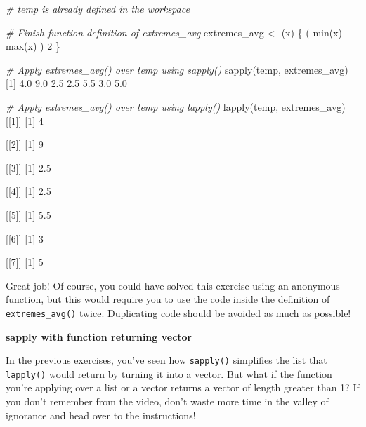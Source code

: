 \documentclass[]{article}
\newcommand{\hlnum}[1]{\textcolor[rgb]{0.816,0.125,0.439}{#1}}%
\newcommand{\hlstr}[1]{\textcolor[rgb]{0.251,0.627,0.251}{#1}}%
\newcommand{\hlcom}[1]{\textcolor[rgb]{0.502,0.502,0.502}{\textit{#1}}}%
\newcommand{\hlstd}[1]{\textcolor[rgb]{0.251,0.251,0.251}{#1}}%
\newcommand{\hlkwd}[1]{\textcolor[rgb]{0.878,0.439,0.125}{#1}}%
\newenvironment{Shaded}{\begin{myshaded}}{\end{myshaded}}
\newcommand{\KeywordTok}[1]{\hlkwd{#1}}
\newcommand{\DecValTok}[1]{\hlnum{#1}}
\newcommand{\FloatTok}[1]{\hlnum{#1}}
\newcommand{\StringTok}[1]{\hlstr{#1}}
\newcommand{\CommentTok}[1]{\hlcom{#1}}
\newcommand{\NormalTok}[1]{\hlstd{#1}}
\begin{document}
\begin{Shaded}
\begin{Highlighting}[]
\CommentTok{# temp is already defined in the workspace}

\CommentTok{# Finish function definition of extremes_avg}
\NormalTok{extremes_avg <-}\StringTok{ }\NormalTok{(x) \{}
\NormalTok{  ( }\KeywordTok{min}\NormalTok{(x) }\OperatorTok{+}\StringTok{ }\KeywordTok{max}\NormalTok{(x) ) }\OperatorTok{/}\StringTok{ }\DecValTok{2}
\NormalTok{\}}

\CommentTok{# Apply extremes_avg() over temp using sapply()}
\KeywordTok{sapply}\NormalTok{(temp, extremes_avg)}
\NormalTok{   [}\DecValTok{1}\NormalTok{] }\FloatTok{4.0} \FloatTok{9.0} \FloatTok{2.5} \FloatTok{2.5} \FloatTok{5.5} \FloatTok{3.0} \FloatTok{5.0}

\CommentTok{# Apply extremes_avg() over temp using lapply()}
\KeywordTok{lapply}\NormalTok{(temp, extremes_avg)}
\NormalTok{   [[}\DecValTok{1}\NormalTok{]]}
\NormalTok{   [}\DecValTok{1}\NormalTok{] }\DecValTok{4}
   
\NormalTok{   [[}\DecValTok{2}\NormalTok{]]}
\NormalTok{   [}\DecValTok{1}\NormalTok{] }\DecValTok{9}
   
\NormalTok{   [[}\DecValTok{3}\NormalTok{]]}
\NormalTok{   [}\DecValTok{1}\NormalTok{] }\FloatTok{2.5}
   
\NormalTok{   [[}\DecValTok{4}\NormalTok{]]}
\NormalTok{   [}\DecValTok{1}\NormalTok{] }\FloatTok{2.5}
   
\NormalTok{   [[}\DecValTok{5}\NormalTok{]]}
\NormalTok{   [}\DecValTok{1}\NormalTok{] }\FloatTok{5.5}
   
\NormalTok{   [[}\DecValTok{6}\NormalTok{]]}
\NormalTok{   [}\DecValTok{1}\NormalTok{] }\DecValTok{3}
   
\NormalTok{   [[}\DecValTok{7}\NormalTok{]]}
\NormalTok{   [}\DecValTok{1}\NormalTok{] }\DecValTok{5}
\end{Highlighting}
\end{Shaded}

Great job! Of course, you could have solved this exercise using an
anonymous function, but this would require you to use the code inside
the definition of \texttt{extremes\_avg()} twice. Duplicating code
should be avoided as much as possible!

\textbf{sapply with function returning vector}

In the previous exercises, you've seen how \texttt{sapply()} simplifies
the list that \texttt{lapply()} would return by turning it into a
vector. But what if the function you're applying over a list or a vector
returns a vector of length greater than 1? If you don't remember from
the video, don't waste more time in the valley of ignorance and head
over to the instructions!
\end{document}
